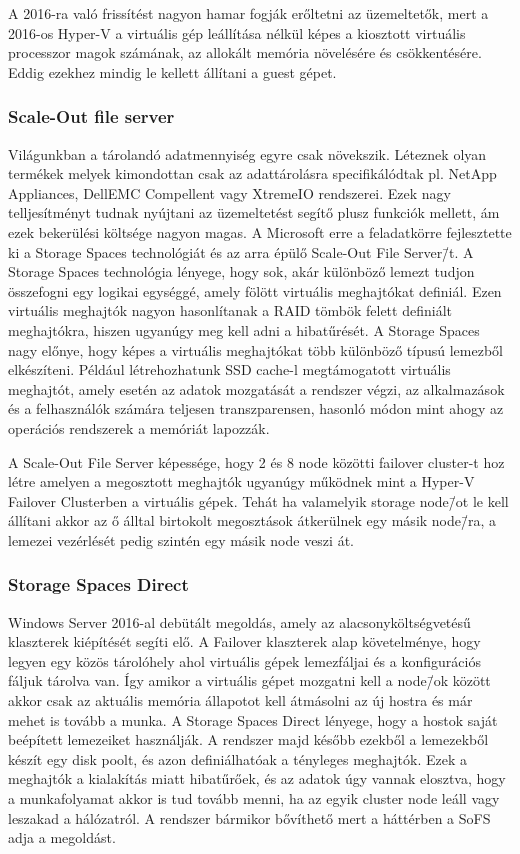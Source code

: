 \documentclass[12pt,oneside,justify,table]{book}
\begin{document}
A 2016-ra való frissítést nagyon hamar fogják erőltetni az üzemeltetők, mert a 2016-os Hyper-V a virtuális gép leállítása nélkül képes a kiosztott virtuális processzor magok számának, az allokált memória növelésére és csökkentésére. Eddig ezekhez mindig le kellett állítani a guest gépet. 

\subsubsection{Scale-Out file server}

Világunkban a tárolandó adatmennyiség egyre csak növekszik. Léteznek olyan termékek melyek kimondottan csak az adattárolásra specifikálódtak pl. NetApp Appliances, DellEMC Compellent vagy XtremeIO rendszerei. Ezek nagy telljesítményt tudnak nyújtani az üzemeltetést segítő plusz funkciók mellett, ám ezek bekerülési költsége nagyon magas.
A Microsoft erre a feladatkörre fejlesztette ki a Storage Spaces technológiát és az arra épülő Scale-Out File Server\=/t.
\newline
A Storage Spaces technológia lényege, hogy sok, akár különböző lemezt tudjon összefogni egy logikai egységgé, amely fölött virtuális meghajtókat definiál. Ezen virtuális meghajtók nagyon hasonlítanak a RAID tömbök felett definiált meghajtókra, hiszen ugyanúgy meg kell adni a hibatűrését.  A Storage Spaces nagy előnye, hogy képes a virtuális meghajtókat több különböző típusú lemezből elkészíteni. Például létrehozhatunk SSD cache-l megtámogatott virtuális meghajtót, amely esetén az adatok mozgatását a rendszer végzi, az alkalmazások és a felhasználók számára teljesen transzparensen, hasonló módon mint ahogy az operációs rendszerek a memóriát lapozzák.

A Scale-Out File Server képessége, hogy 2 és 8 node közötti failover cluster-t hoz létre amelyen a megosztott meghajtók ugyanúgy működnek mint a Hyper-V Failover Clusterben a virtuális gépek. Tehát ha valamelyik storage node\=/ot le kell állítani akkor az ő álltal birtokolt megosztások átkerülnek egy másik node\=/ra, a lemezei vezérlését pedig szintén egy másik node veszi át.

\subsubsection{Storage Spaces Direct}

Windows Server 2016-al debütált megoldás, amely az alacsonyköltségvetésű klaszterek kiépítését segíti elő. A Failover klaszterek alap követelménye, hogy legyen egy közös tárolóhely ahol virtuális gépek lemezfáljai és a konfigurációs fáljuk tárolva van. Így amikor a virtuális gépet mozgatni kell a node\=/ok között akkor csak az aktuális memória állapotot kell átmásolni az új hostra és már mehet is tovább a munka. 
A Storage Spaces Direct lényege, hogy a hostok saját beépített lemezeiket használják. A rendszer majd később ezekből a lemezekből készít egy disk poolt, és azon definiálhatóak a tényleges meghajtók. Ezek a meghajtók a kialakítás miatt hibatűrőek, és az adatok úgy vannak elosztva, hogy a munkafolyamat akkor is tud tovább menni, ha az egyik cluster node leáll vagy leszakad a hálózatról.
A rendszer bármikor bővíthető mert a háttérben a SoFS adja a megoldást.
\end{document}
